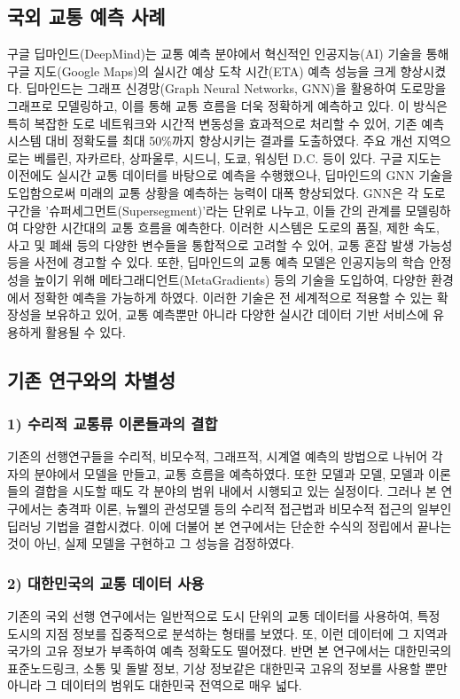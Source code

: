 \documentclass[11pt]{report}
\begin{document}
\subsection{국외 교통 예측 사례}
구글 딥마인드(DeepMind)는 교통 예측 분야에서 혁신적인 인공지능(AI) 기술을 통해 구글 지도(Google Maps)의 실시간 예상 도착 시간(ETA) 예측 성능을 크게 향상시켰다. 
딥마인드는 그래프 신경망(Graph Neural Networks, GNN)을 활용하여 도로망을 그래프로 모델링하고, 이를 통해 교통 흐름을 더욱 정확하게 예측하고 있다. 
이 방식은 특히 복잡한 도로 네트워크와 시간적 변동성을 효과적으로 처리할 수 있어, 기존 예측 시스템 대비 정확도를 최대 50\%까지 향상시키는 결과를 도출하였다. 
주요 개선 지역으로는 베를린, 자카르타, 상파울루, 시드니, 도쿄, 워싱턴 D.C. 등이 있다. 
구글 지도는 이전에도 실시간 교통 데이터를 바탕으로 예측을 수행했으나, 딥마인드의 GNN 기술을 도입함으로써 미래의 교통 상황을 예측하는 능력이 대폭 향상되었다. 
GNN은 각 도로 구간을 ’슈퍼세그먼트(Supersegment)’라는 단위로 나누고, 이들 간의 관계를 모델링하여 다양한 시간대의 교통 흐름을 예측한다. 
이러한 시스템은 도로의 품질, 제한 속도, 사고 및 폐쇄 등의 다양한 변수들을 통합적으로 고려할 수 있어, 교통 혼잡 발생 가능성 등을 사전에 경고할 수 있다. 
또한, 딥마인드의 교통 예측 모델은 인공지능의 학습 안정성을 높이기 위해 메타그래디언트(MetaGradients) 등의 기술을 도입하여, 다양한 환경에서 정확한 예측을 가능하게 하였다. 
이러한 기술은 전 세계적으로 적용할 수 있는 확장성을 보유하고 있어, 교통 예측뿐만 아니라 다양한 실시간 데이터 기반 서비스에 유용하게 활용될 수 있다.

\subsection{기존 연구와의 차별성}
\subsubsection*{1) 수리적 교통류 이론들과의 결합}
기존의 선행연구들을 수리적, 비모수적, 그래프적, 시계열 예측의 방법으로 나뉘어 각자의 분야에서 모델을 만들고, 교통 흐름을 예측하였다. 
또한 모델과 모델, 모델과 이론들의 결합을 시도할 때도 각 분야의 범위 내에서 시행되고 있는 실정이다. 
그러나 본 연구에서는 충격파 이론, 뉴웰의 관성모델 등의 수리적 접근법과 비모수적 접근의 일부인 딥러닝 기법을 결합시켰다. 
이에 더불어 본 연구에서는 단순한 수식의 정립에서 끝나는 것이 아닌, 실제 모델을 구현하고 그 성능을 검정하였다. 
\subsubsection*{2) 대한민국의 교통 데이터 사용}
기존의 국외 선행 연구에서는 일반적으로 도시 단위의 교통 데이터를 사용하여, 특정 도시의 지점 정보를 집중적으로 분석하는 형태를 보였다. 
또, 이런 데이터에 그 지역과 국가의 고유 정보가 부족하여 예측 정확도도 떨어졌다. 
반면 본 연구에서는 대한민국의 표준노드링크, 소통 및 돌발 정보, 기상 정보같은 대한민국 고유의 정보를 사용할 뿐만 아니라 그 데이터의 범위도 대한민국 전역으로 매우 넓다. 
\end{document}
